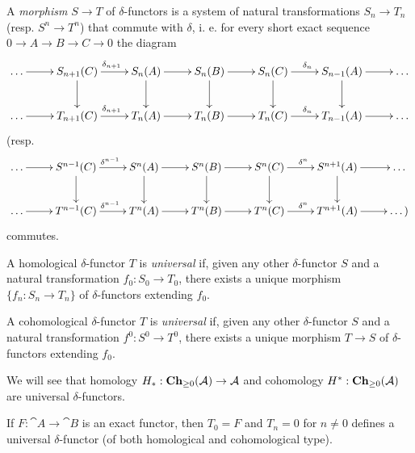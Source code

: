 \begin{definition}
	A \textit{morphism} $S \rightarrow T$ of $\delta$-functors is a system of natural transformations $S_n \rightarrow T_n$ (resp. $S^n \rightarrow T^n$) that commute with $\delta$, i. e. for every short exact sequence $0 \rightarrow A \rightarrow B \rightarrow C \rightarrow 0$ the diagram
	\[
		\xymatrix{
			\dots \ar[r] &S_{n+1}(C) \ar[r]^{\delta_{n+1}} \ar[d] &S_n(A) \ar[r] \ar[d] &S_n(B) \ar[r] \ar[d] &S_n(C) \ar[r]^{\delta_n} \ar[d] &S_{n-1}(A) \ar[r] \ar[d] &\dots \\
			\dots \ar[r] &T_{n+1}(C) \ar[r]^{\delta_{n+1}} &T_n(A) \ar[r] &T_n(B) \ar[r] &T_n(C) \ar[r]^{\delta_n} &T_{n-1}(A) \ar[r] &\dots
		}
	\]
	(resp.
	\[
		\xymatrix{
			\dots \ar[r] &S^{n-1}(C) \ar[r]^{\delta^{n-1}} \ar[d] &S^n(A) \ar[r] \ar[d] &S^n(B) \ar[r] \ar[d] &S^n(C) \ar[r]^{\delta^n} \ar[d] &S^{n+1}(A) \ar[r] \ar[d] &\dots \\
			\dots \ar[r] &T^{n-1}(C) \ar[r]^{\delta^{n-1}} &T^n(A) \ar[r] &T^n(B) \ar[r] &T^n(C) \ar[r]^{\delta^n} &T^{n+1}(A) \ar[r] &\dots)
		}
	\]
	commutes.
	
	A homological $\delta$-functor $T$ is \textit{universal} if, given any other $\delta$-functor $S$ and a natural transformation $f_0:S_0\rightarrow T_0$, there exists a unique morphism $\{f_n:S_n\rightarrow T_n\}$ of $\delta$-functors extending $f_0$.
	
	A cohomological $\delta$-functor $T$ is \textit{universal} if, given any other $\delta$-functor $S$ and a natural transformation $f^0:S^0\rightarrow T^0$, there exists a unique morphism $T\rightarrow S$ of $\delta$-functors extending $f_0$.
\end{definition}

\begin{example}
	We will see that homology $H_*:\textrm{\textup{\textbf{Ch}}}_{\geq0}(\mathcal{A}) \rightarrow \mathcal{A}$ and cohomology $H^*:\textrm{\textup{\textbf{Ch}}}_{\geq0}(\mathcal{A})$ are universal $\delta$-functors.
\end{example}

\begin{exercise}
	If $F:\cat{A}\rightarrow\cat{B}$ is an exact functor, then $T_0=F$ and $T_n=0$ for $n\neq0$ defines a universal $\delta$-functor (of both homological and cohomological type).
\end{exercise}

